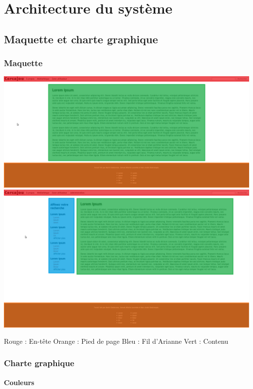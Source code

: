 \documentclass[letter, 10pt]{report}
\begin{document}
\chapter{Architecture du système}

\section{Maquette et charte graphique}

\subsection{Maquette}

\includegraphics[scale=0.5]{primaryWindow.png}
\includegraphics[scale=0.5]{secondaryWindow.png}

Rouge : En-tête
Orange : Pied de page
Bleu : Fil d'Arianne
Vert : Contenu

\subsection{Charte graphique}

\subsubsection{Couleurs}
\end{document}
